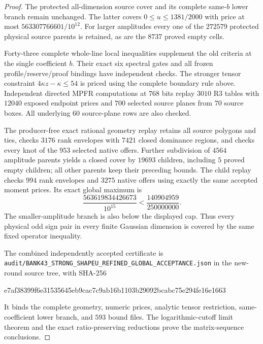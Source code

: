 \documentclass[11pt]{article}
\begin{document}
\begin{proof}
The protected all-dimension source cover and its complete same-$b$
lower branch remain unchanged. The latter covers
$0\leq u\leq1381/2000$ with price at most
$563307766601/10^{12}$.
For larger amplitudes every one of the $272579$ protected physical
source parents is retained, as are the $8737$ proved empty cells.

Forty-three complete whole-line local inequalities supplement the
old criteria at the single coefficient $b$. Their exact six spectral
gates and all frozen profile/reserve/proof bindings have independent
checks. The stronger tensor constraint
$4\kappa z-\kappa\leq54$ is priced using the complete boundary
rule above. Independent directed MPFR computations at $768$ bits
replay $3010$ R3 tables with $12040$ exposed endpoint prices and
$700$ selected source planes from $70$ source boxes.
All underlying $60$ source-plane rows are also checked.

The producer-free exact rational geometry replay retains all source
polygons and ties, checks $3176$ rank envelopes with $7421$ closed
dominance regions, and checks every knot of the $953$ selected native
offers. Further subdivision of $4564$ amplitude parents yields a
closed cover by $19693$ children, including $5$ proved empty children;
all other parents keep their preceding bounds. The child replay checks
$994$ rank envelopes and $3275$ native offers using exactly the same
accepted moment prices. Its exact global maximum is
\[
 \frac{563619834426673}{10^{15}}
           <\frac{140904959}{250000000}.
\]
The smaller-amplitude branch is also below the displayed cap. Thus
every physical odd sign pair in every finite Gaussian dimension is
covered by the same fixed operator inequality.

The combined independently accepted certificate is
\texttt{audit/\allowbreak BANK43\_\allowbreak STRONG\_\allowbreak SHAPEU\_\allowbreak REFINED\_\allowbreak GLOBAL\_\allowbreak ACCEPTANCE.json}
in the new-round source tree, with SHA-256
\begin{center}\small\ttfamily
e7af38399f6e31535645eb9cac7c9ab16b1103b29092bcabc75e294fe16e1663
\end{center}
It binds the complete geometry, numeric prices, analytic tensor
restriction, same-coefficient lower branch, and $593$ bound files.
The logarithmic-cutoff limit theorem and the exact ratio-preserving
reductions prove the matrix-sequence conclusions.
\end{proof}

\end{document}
